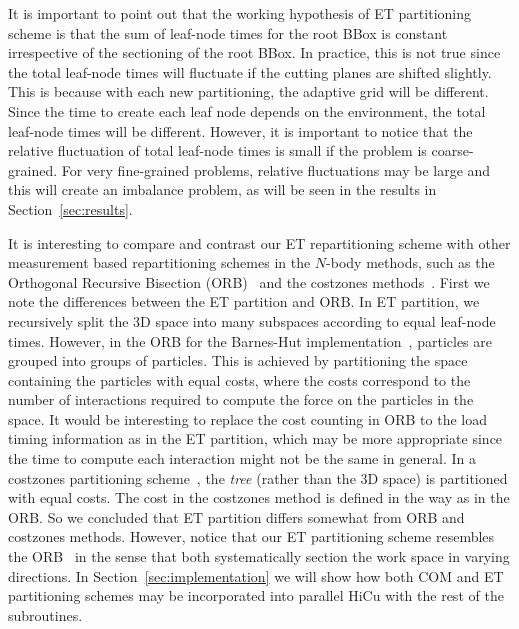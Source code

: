\documentclass[preprint]{revtex4}
\begin{document}
It is important to point out that the working hypothesis of ET
partitioning scheme is that the sum of leaf-node times
for the root BBox is constant irrespective of the sectioning of the
root BBox.  In practice, this is not true since the total leaf-node
times will fluctuate if the cutting planes are shifted slightly. This
is because with each new partitioning, the adaptive grid will be
different. Since the time to create each leaf node depends on the
environment, the total leaf-node times will be different. However, it
is important to notice that the relative fluctuation of total
leaf-node times is small if the problem is coarse-grained. For very
fine-grained problems, relative fluctuations may be large and this
will create an imbalance problem, as will be seen in the results in
Section~\ref{sec:results}.

It is interesting to compare and contrast our ET repartitioning scheme
with other measurement based repartitioning schemes in the $N$-body
methods, such as the Orthogonal Recursive Bisection
(ORB)~\cite{warren:92_article} and the costzones
methods~\cite{Singh93}.  First we note the differences
between the ET partition and ORB.  In ET partition, we recursively split the 3D
space into many subspaces according to equal leaf-node times. However,
in the ORB for the Barnes-Hut
implementation~\cite{warren:92_article}, particles are grouped into groups
of particles.  This is achieved by partitioning the space containing
the particles with equal costs, where the costs correspond to the
number of interactions required to compute the force on the particles
in the space. It would be interesting to replace the cost counting in
ORB to the load timing information as in the ET partition, which may be more
appropriate since the time to compute each interaction might not be
the same in general.  In a costzones partitioning scheme~\cite{Singh93}, the {\it
tree} (rather than the 3D space) is partitioned 
with equal costs. The cost in the costzones method is defined in the
way as in the ORB.  So we concluded that ET partition
differs somewhat from ORB and costzones methods.  However, notice that
our ET partitioning scheme resembles the
ORB~\cite{warren:92_article} in the sense that both systematically section the work
space in varying directions.  In
Section~\ref{sec:implementation} we will show how both COM and ET
partitioning schemes may be incorporated into parallel HiCu with the
rest of the subroutines.
\end{document}
